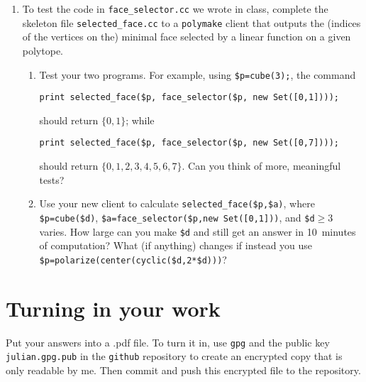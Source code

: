\documentclass[11pt]{amsart}
\begin{document}
 \begin{enumerate}
   \setlength{\itemsep}{2ex}
 \item To test the code in \texttt{face\_selector.cc} we wrote in class, complete the skeleton file \texttt{selected\_face.cc} to a \texttt{polymake} client that outputs the (indices of the vertices on the) minimal face selected by a linear function on a given polytope. 
\begin{enumerate}
\item Test your two programs. For example, using \verb|$p=cube(3);|,
  the command 
\begin{verbatim}
print selected_face($p, face_selector($p, new Set([0,1])));
\end{verbatim}
should return $\{0,1\}$; while 
\begin{verbatim}
print selected_face($p, face_selector($p, new Set([0,7])));
\end{verbatim}
should return  $\{0,1,2,3,4,5,6,7\}$. Can you think of more, meaningful tests?

\item Use your new client to calculate \verb|selected_face($p,$a)|, where \verb|$p=cube($d)|, \verb|$a=face_selector($p,new Set([0,1]))|, and \verb|$d|${}\ge3$ varies. How large can you make \verb|$d| and still get an answer in 10~minutes of computation? What (if anything) changes if instead you use \verb|$p=polarize(center(cyclic($d,2*$d)))|? 
\end{enumerate}
 \end{enumerate}


\bigskip
\section*{Turning in your work}

Put your answers into a .pdf file. To turn it in, use \texttt{gpg} and the public key \texttt{julian.gpg.pub} in the \texttt{github} repository to create an encrypted copy that is only readable by me. Then commit and push this encrypted file to the repository.
\end{document}
